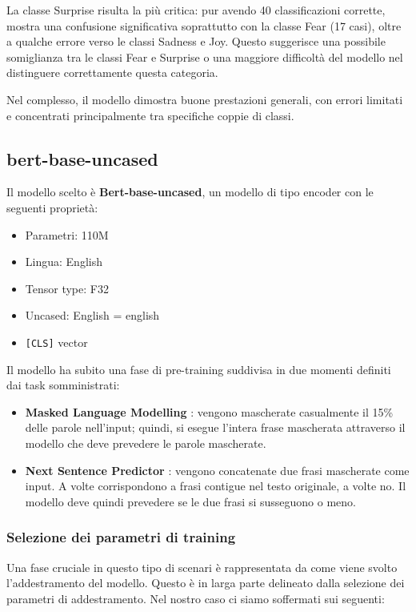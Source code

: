 \documentclass[a4paper,12pt]{article}
\begin{document}
La classe Surprise risulta la più critica: pur avendo 40 classificazioni corrette, mostra una confusione significativa soprattutto con la classe Fear (17 casi), oltre a qualche errore verso le classi Sadness e Joy. Questo suggerisce una possibile somiglianza tra le classi Fear e Surprise o una maggiore difficoltà del modello nel distinguere correttamente questa categoria.

Nel complesso, il modello dimostra buone prestazioni generali, con errori limitati e concentrati principalmente tra specifiche coppie di classi.


\subsection{bert-base-uncased}
Il modello scelto è \textbf{Bert-base-uncased}, un modello di tipo encoder con le seguenti proprietà:

\begin{itemize}
    \item Parametri: 110M
    \item Lingua: English
    \item Tensor type: F32
    \item Uncased: English = english
    \item \texttt{[CLS]} vector
\end{itemize}

Il modello ha subito una fase di pre-training suddivisa in due momenti definiti dai task somministrati:

\begin{itemize}
    \item \textbf{Masked Language Modelling }: vengono mascherate casualmente il 15\% delle parole nell’input; quindi, si esegue l'intera frase mascherata attraverso il modello che deve prevedere le parole mascherate.
    \item \textbf{Next Sentence Predictor }: vengono concatenate due frasi mascherate come input. A volte corrispondono a frasi contigue nel testo originale, a volte no. Il modello deve quindi prevedere se le due frasi si susseguono o meno.
\end{itemize}

\subsubsection{Selezione dei parametri di training}

Una fase cruciale in questo tipo di scenari è rappresentata da come viene svolto l’addestramento del modello. Questo è in larga parte delineato dalla selezione dei parametri di addestramento. Nel nostro caso ci siamo soffermati sui seguenti:
\end{document}
